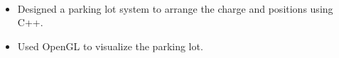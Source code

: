 \RoboticsCompetition
\vspace{\betweenEntry}

\JI
{}\\
\begin{minipage}[t]{\miniwidth}
    \begin{itemize}
        \item 
        Designed a parking lot system to arrange the charge and positions using C++.
        \item 
        Used OpenGL to visualize the parking lot.
    \end{itemize}
\end{minipage}
\vspace{\betweenEntry}

\TowerDefence
